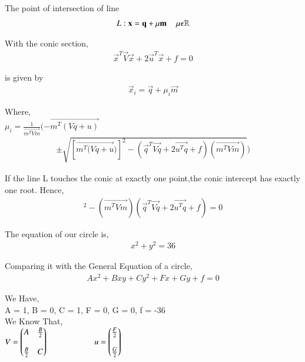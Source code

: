 \documentclass[journal,12pt,twocolumn]{IEEEtran}
\begin{document}
The point of intersection of line\\
\centering
\begin{align}
L : \vec{x} = \vec{q} + \mu \vec{m}  \hspace{0.4cm} \mu \epsilon \mathbb{R}
\end{align} 
\raggedright
With the conic section,\\
\centering
\begin{align}
\vec{x}^T \vec{V}\vec{x} + 2 \vec{u}^T \vec{x} + f = 0
\label{eq2}
\end{align}
\raggedright
is given by\\
\centering
\begin{align}
\vec{x}_i = \vec{q} + \mu_i \vec{m}
\label{eq3}
\end{align}
\raggedright
Where,\\
$\mu_i = \frac{1}{\vec{m^T Vm}}(-\vec{m^T(Vq+u)}$ \\ 
\begin{align}
\pm \sqrt{[\vec{m^T(Vq+u})]^2 - (\vec{q}^T \vec{Vq} + 2 \vec{u^T q} + f) (\vec{m^T Vm})} )
\label{eq4}
\end{align}
\raggedright
If the line L touches the conic at exactly one point,the conic intercept has exactly one root. Hence, \\
\centering
\begin{align}
[\vec{m^T(Vqu})]^2 - (\vec{m^T Vm}) (\vec{q}^T \vec{Vq} + 2 \vec{u^T q} + f)  = 0
\label{eq5}
\end{align}
\raggedright
The equation of our circle is,\\
\centering 
\begin{align}
x^2 + y^2 = 36
\label{eq6}
\end{align}
\raggedright
Comparing it with the General Equation of a circle,\\
\centering
\begin{align}
Ax^2 + Bxy + Cy^2 + Fx + Gy + f = 0
\end{align}
\raggedright
We Have,\\
\vspace{0.25cm}
A = 1, B = 0, C = 1, F = 0, G = 0, f = -36\\
\vspace{0.25cm}
We Know That,\\
\vspace{0.25cm}
\centering
$ V = \myvec{A&\frac{B}{2}\\\\\frac{B}{2}&C} \hspace{2cm} u = \myvec{\frac{F}{2}\\\\\frac{G}{2}} $\\
\end{document}
